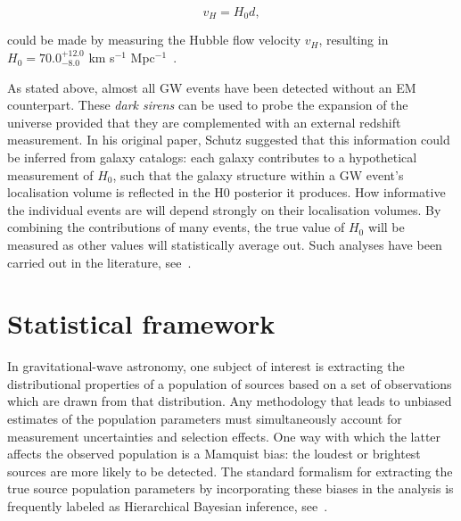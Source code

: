 \documentclass[%
 reprint,
 amsmath,amssymb,
 aps,
]{revtex4-2}
\begin{document}
\begin{equation}
	v_H = H_0 d,
\end{equation}

could be made by measuring the Hubble flow velocity $v_H$, resulting in $H_0 = 70.0^{+12.0}_{-8.0}$
km s$^{-1}$ Mpc$^{-1}$~\cite{LIGOScientific:2017adf}.

As stated above, almost all GW events have been detected without an EM counterpart. These
\textit{dark sirens} can be used to probe the expansion of the universe provided that they are
complemented with an external redshift measurement. In his original paper, Schutz suggested that
this information could be inferred from galaxy catalogs: each galaxy contributes to a hypothetical
measurement of $H_0$, such that the galaxy structure within a GW event's localisation volume is
reflected in the H0 posterior it produces. How informative the individual events are will depend
strongly on their localisation volumes. By combining the contributions of many events, the true
value of $H_0$ will be measured as other values will statistically average out. Such analyses have
been carried out in the literature,
see~\cite{DelPozzo:2011vcw,Chen:2017rfc,LIGOScientific:2018gmd,Gray:2019ksv,DES:2019ccw,DES:2020nay}.

\section{\label{sec:framework}Statistical framework}

In gravitational-wave astronomy, one subject of interest is extracting the distributional
properties of a population of sources based on a set of observations which are drawn from that
distribution. Any methodology that leads to unbiased estimates of the population parameters must
simultaneously account for measurement uncertainties and selection effects. One way with which the
latter affects the observed population is a Mamquist bias: the loudest or brightest sources are
more likely to be detected. The standard formalism for extracting the true source population
parameters by incorporating these biases in the analysis is frequently labeled as Hierarchical
Bayesian inference, see~\cite{Loredo:2004nn,Mandel:2018mve, Vitale:2020aaz}.

\end{document}

